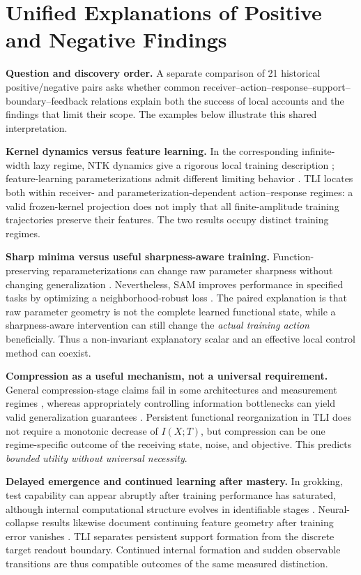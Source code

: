 \documentclass{article}
\begin{document}
\section{Unified Explanations of Positive and Negative Findings}
\label{sec:unified}
\noindent\textbf{Question and discovery order.}
A separate comparison of 21 historical positive/negative pairs asks whether common receiver--action--response--support--boundary--feedback relations explain both the success of local accounts and the findings that limit their scope. The examples below illustrate this shared interpretation.

\noindent\textbf{Kernel dynamics versus feature learning.}
In the corresponding infinite-width lazy regime, NTK dynamics give a rigorous local training description \cite{jacot2018}; feature-learning parameterizations admit different limiting behavior \cite{yang2021}. TLI locates both within receiver- and parameterization-dependent action--response regimes: a valid frozen-kernel projection does not imply that all finite-amplitude training trajectories preserve their features. The two results occupy distinct training regimes.

\noindent\textbf{Sharp minima versus useful sharpness-aware training.}
Function-preserving reparameterizations can change raw parameter sharpness without changing generalization \cite{dinh2017}. Nevertheless, SAM improves performance in specified tasks by optimizing a neighborhood-robust loss \cite{foret2021}. The paired explanation is that raw parameter geometry is not the complete learned functional state, while a sharpness-aware intervention can still change the \emph{actual training action} beneficially. Thus a non-invariant explanatory scalar and an effective local control method can coexist.

\noindent\textbf{Compression as a useful mechanism, not a universal requirement.}
General compression-stage claims fail in some architectures and measurement regimes \cite{saxe2018}, whereas appropriately controlling information bottlenecks can yield valid generalization guarantees \cite{kawaguchi2023}. Persistent functional reorganization in TLI does not require a monotonic decrease of $I(X;T)$, but compression can be one regime-specific outcome of the receiving state, noise, and objective. This predicts \emph{bounded utility without universal necessity}.

\noindent\textbf{Delayed emergence and continued learning after mastery.}
In grokking, test capability can appear abruptly after training performance has saturated, although internal computational structure evolves in identifiable stages \cite{nanda2023}. Neural-collapse results likewise document continuing feature geometry after training error vanishes \cite{papyan2020}. TLI separates persistent support formation from the discrete target readout boundary. Continued internal formation and sudden observable transitions are thus compatible outcomes of the same measured distinction.
\end{document}
